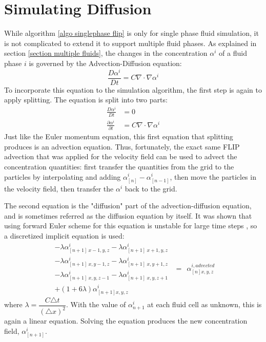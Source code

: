 \section{Simulating Diffusion}
While algorithm \ref{algo singlephase flip} is only for single phase fluid simulation, it is not complicated to extend it to support multiple fluid phases. As explained in section \ref{section multiple fluids}, the changes in the concentration $\alpha^i$ of a fluid phase $i$ is governed by the Advection-Diffusion equation:
$$
\frac{D \alpha^i}{D t} = C\nabla \cdot \nabla \alpha^i
$$
To incorporate this equation to the simulation algorithm, the first step is again to apply splitting. The equation is split into two parts:
\begin{equation*}
    \begin{aligned}
        \frac{D \alpha^i}{D t} &= 0\\
        \frac{\partial \alpha^i}{\partial t} &= C\nabla \cdot \nabla \alpha^i
    \end{aligned}
\end{equation*}
Just like the Euler momentum equation, this first equation that splitting produces is an advection equation. Thus, fortunately, the exact same FLIP advection that was applied for the velocity field can be used to advect the concentration quantities: first transfer the quantities from the grid to the particles by interpolating and adding $\alpha^{i}_{[n]} - \alpha^{i}_{[n-1]}$, then move the particles in the velocity field, then transfer the $\alpha^i$ back to the grid. 

The second equation is the "diffusion" part of the advection-diffusion equation, and is sometimes referred as the diffusion equation by itself. It was shown that using forward Euler scheme for this equation is unstable for large time steps \cite{kang2010hybrid}, so a discretized implicit equation is used:
\begin{equation*}
    \begin{aligned}
        - \lambda\alpha^i_{[n+1]~x-1,y,z}
        - \lambda\alpha^i_{[n+1]~x+1,y,z}\\
        - \lambda\alpha^i_{[n+1]~x,y-1,z}
        - \lambda\alpha^i_{[n+1]~x,y+1,z}\\
        - \lambda\alpha^i_{[n+1]~x,y,z-1}
        - \lambda\alpha^i_{[n+1]~x,y,z+1}\\
        +(1+6\lambda)\alpha^i_{[n+1] x,y,z} 
    \end{aligned}
    ~~=~~ \alpha^{i,advected}_{[n] x,y,z} 
\end{equation*}
where $\lambda = \dfrac{C\triangle t}{(\triangle x)^2}$. With the value of $\alpha^i_{n+1}$ at each fluid cell as unknown, this is again a linear equation. Solving the equation produces the new concentration field, $\alpha^i_{[n+1]}$.

